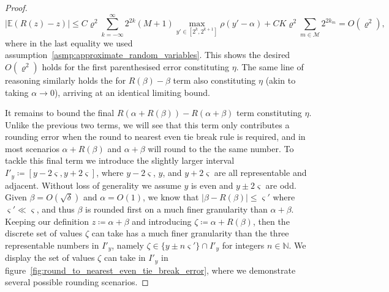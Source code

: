 \documentclass[9pt,a4paper,english]{extarticle}
\begin{document}
\begin{proof}
\begin{equation*}
\lvert \mathbb{E}(R(z) - z) \rvert  \leq C \varrho^2 \sum_{k=-\infty}^{\infty}   2^{2k} (M+1) \max_{y'\in[2^{k}, 2^{k+1}]} \rho(y' - \alpha) 
+ C K \varrho^2 \sum_{m \in \mathcal{M}} 2^{2k_m} = O(\varrho^2), 
\end{equation*}
where in the last equality we used assumption~\ref{asmp:approximate_random_variables}. This shows the desired $ O(\varrho^2) $ holds for the first parenthesised error constituting $ \eta $. The same line of reasoning similarly holds the for $ R(\beta) - \beta $ term also constituting $ \eta $ (akin to taking $ \alpha \to 0 $), arriving at an identical limiting bound.

It remains to bound the final $ R(\alpha + R(\beta)) - R(\alpha + \beta) $ term constituting $ \eta $. Unlike the previous two terms, we will see that this term only contributes a rounding error when the round to nearest even tie break rule is required, and in most scenarios $ \alpha + R(\beta)$ and $\alpha + \beta $ will round to the the same number. To tackle this final term we introduce the slightly larger interval $ I'_y \coloneqq [y-2\varsigma, y+2\varsigma] $, where $ y-2\varsigma $, $ y $, and $ y + 2\varsigma $ are all representable and adjacent. Without loss of generality we assume $ y $ is even and $ y \pm 2\varsigma $ are odd. Given $ \beta = O(\sqrt{\delta}) $ and $ \alpha  = O(1) $, we know that $ \lvert \beta - R(\beta)\rvert \leq \varsigma' $ where $ \varsigma' \ll \varsigma $, and thus $ \beta  $ is rounded first on a much finer granularity than $ \alpha + \beta $. Keeping our definition $ z \coloneqq \alpha + \beta $ and introducing $ \zeta \coloneqq \alpha + R(\beta) $, then the discrete set of values $ \zeta $ can take has a much finer granularity than the three representable numbers in $ I'_y $, namely $ \zeta \in \{y \pm n \varsigma'\} \cap I'_y$ for integers $ n \in \mathbb{N} $. We display the set of values $ \zeta $ can take in $ I'_y $ in figure~\ref{fig:round_to_nearest_even_tie_break_error}, where we demonstrate several possible rounding scenarios. 


\end{proof}
\end{document}
